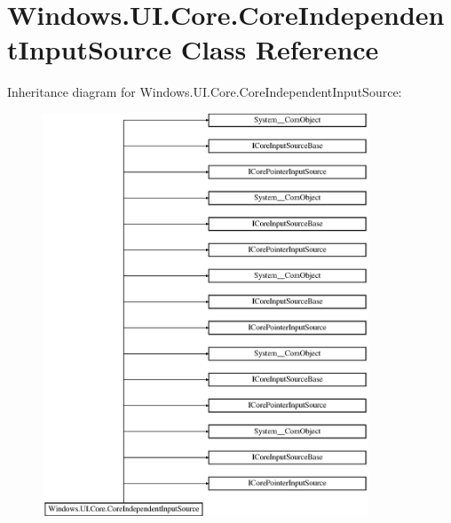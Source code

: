 \hypertarget{class_windows_1_1_u_i_1_1_core_1_1_core_independent_input_source}{}\section{Windows.\+U\+I.\+Core.\+Core\+Independent\+Input\+Source Class Reference}
\label{class_windows_1_1_u_i_1_1_core_1_1_core_independent_input_source}
Inheritance diagram for Windows.\+U\+I.\+Core.\+Core\+Independent\+Input\+Source\+:\begin{figure}[H]
\begin{center}
\leavevmode
\includegraphics[height=12.000000cm]{class_windows_1_1_u_i_1_1_core_1_1_core_independent_input_source}
\end{center}
\end{figure}
